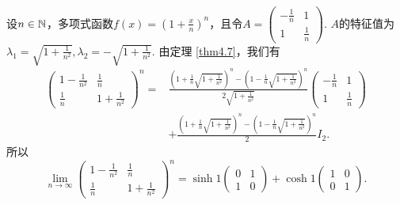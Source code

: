 \begin{solution}
  设$n\in\mathbb N$，多项式函数$f(x)=\left(1+\frac xn\right)^n$，且令$A=\begin{pmatrix}
    -\frac1n & 1 \\
    1 & \frac1n
  \end{pmatrix}$. $A$的特征值为$\lambda_1=\sqrt{1+\frac1{n^2}},\lambda_2=
  -\sqrt{1+\frac1{n^2}}$. 由定理 \ref{thm4.7}，我们有
  \begin{align*}
    \begin{pmatrix}
      1-\frac1{n^2} & \frac1n \\
      \frac1n & 1+\frac1{n^2}
    \end{pmatrix}^n = {}& \frac{
      \left(1+\frac1n\sqrt{1+\frac1{n^2}} \right)^n - \left(1-\frac1n\sqrt{1+\frac1{n^2}} \right)^n
    }{2\sqrt{1+\frac1{n^2}}}\begin{pmatrix}
      -\frac1n & 1 \\
      1 & \frac1n
    \end{pmatrix} \\
    & + \frac{
      \left(1+\frac1n\sqrt{1+\frac1{n^2}} \right)^n - \left(1-\frac1n\sqrt{1+\frac1{n^2}} \right)^n
    }2I_2.
  \end{align*}
  所以
  \[
    \lim_{n\to\infty} \begin{pmatrix}
      1-\frac1{n^2} & \frac1n \\
      \frac1n & 1+\frac1{n^2}
    \end{pmatrix}^n =
    \sinh 1\begin{pmatrix}
      0 & 1 \\
      1 & 0
    \end{pmatrix} + \cosh 1 \begin{pmatrix}
      1 & 0 \\
      0 & 1
    \end{pmatrix}.
  \]
\end{solution}

